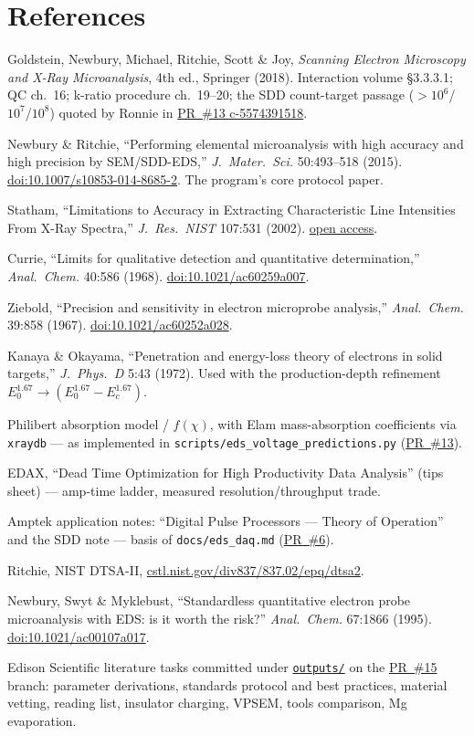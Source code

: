 \documentclass[11pt]{article}
\newcommand{\pr}[1]{\href{https://github.com/vertical-cloud-lab/caliber/pull/#1}{PR~\##1}}
\newcommand{\prc}[2]{\href{https://github.com/vertical-cloud-lab/caliber/pull/#1\#issuecomment-#2}{PR~\##1 c-#2}}
\begin{document}
\section*{References}
\begin{enumerate}[label={[\arabic*]}, itemsep=2pt]
\item Goldstein, Newbury, Michael, Ritchie, Scott \& Joy, \emph{Scanning Electron
Microscopy and X-Ray Microanalysis}, 4th ed., Springer (2018). Interaction volume
\S3.3.3.1; QC ch.~16; k-ratio procedure ch.~19--20; the SDD count-target passage
($>10^6$/$10^7$/$10^8$) quoted by Ronnie in \prc{13}{5574391518}.
\item Newbury \& Ritchie, ``Performing elemental microanalysis with high accuracy
and high precision by SEM/SDD-EDS,'' \emph{J.\ Mater.\ Sci.} 50:493--518 (2015).
\href{https://doi.org/10.1007/s10853-014-8685-2}{doi:10.1007/s10853-014-8685-2}.
The program's core protocol paper.
\item Statham, ``Limitations to Accuracy in Extracting Characteristic Line
Intensities From X-Ray Spectra,'' \emph{J.\ Res.\ NIST} 107:531 (2002).
\href{https://pmc.ncbi.nlm.nih.gov/articles/PMC4863855/}{open access}.
\item Currie, ``Limits for qualitative detection and quantitative determination,''
\emph{Anal.\ Chem.} 40:586 (1968).
\href{https://doi.org/10.1021/ac60259a007}{doi:10.1021/ac60259a007}.
\item Ziebold, ``Precision and sensitivity in electron microprobe analysis,''
\emph{Anal.\ Chem.} 39:858 (1967).
\href{https://doi.org/10.1021/ac60252a028}{doi:10.1021/ac60252a028}.
\item Kanaya \& Okayama, ``Penetration and energy-loss theory of electrons in solid
targets,'' \emph{J.\ Phys.\ D} 5:43 (1972). Used with the production-depth
refinement $E_0^{1.67} \to (E_0^{1.67} - E_c^{1.67})$.
\item Philibert absorption model / $f(\chi)$, with Elam mass-absorption
coefficients via \texttt{xraydb} --- as implemented in
\texttt{scripts/eds\_voltage\_predictions.py} (\pr{13}).
\item EDAX, ``Dead Time Optimization for High Productivity Data Analysis''
(tips sheet) --- amp-time ladder, measured resolution/throughput trade.
\item Amptek application notes: ``Digital Pulse Processors --- Theory of
Operation'' and the SDD note --- basis of \texttt{docs/eds\_daq.md} (\pr{6}).
\item Ritchie, NIST DTSA-II,
\href{https://www.cstl.nist.gov/div837/837.02/epq/dtsa2/index.html}{cstl.nist.gov/div837/837.02/epq/dtsa2}.
\item Newbury, Swyt \& Myklebust, ``Standardless quantitative electron probe
microanalysis with EDS: is it worth the risk?'' \emph{Anal.\ Chem.} 67:1866 (1995).
\href{https://doi.org/10.1021/ac00107a017}{doi:10.1021/ac00107a017}.
\item Edison Scientific literature tasks committed under
\href{https://github.com/vertical-cloud-lab/caliber/tree/claude/issue-1-20260909-0027/outputs}{\texttt{outputs/}}
on the \pr{15} branch: parameter derivations, standards protocol and best
practices, material vetting, reading list, insulator charging, VPSEM, tools
comparison, Mg evaporation.
\end{enumerate}
\end{document}
